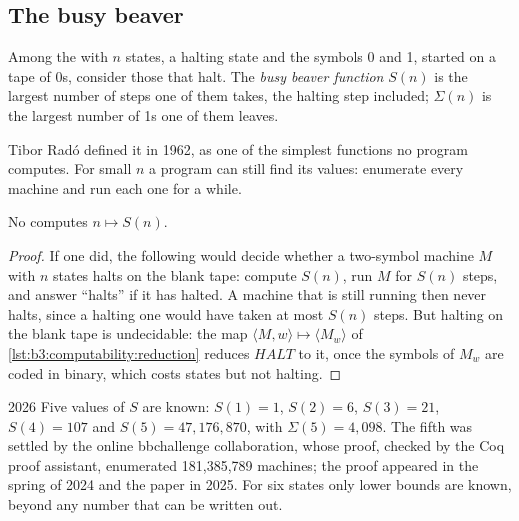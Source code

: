 \subsection{The busy beaver}

\begin{definition}\label{def:b3:computability:busy-beaver}
Among the  with $n$ states, a halting state and the symbols 0 and 1, started on a tape of 0s, consider those that halt. The \emph{busy beaver function} $S(n)$ is the largest number of steps one of them takes, the halting step included; $\Sigma(n)$ is the largest number of 1s one of them leaves.
\end{definition}

Tibor Radó defined it in 1962, as one of the simplest functions no program computes. %
For small $n$ a program can still find its values: enumerate every machine and run each one for a while.

\label{lst:b3:computability:busy}

\label{out:b3:computability:busy}

\begin{theorem}\label{thm:b3:computability:busy-beaver}
No  computes $n \mapsto S(n)$.
\end{theorem}

\begin{proof}
If one did, the following would decide whether a two-symbol machine $M$ with $n$ states halts on the blank tape: compute $S(n)$, run $M$ for $S(n)$ steps, and answer ``halts'' if it has halted. A machine that is still running then never halts, since a halting one would have taken at most $S(n)$ steps. But halting on the blank tape is undecidable: the map $\langle M, w \rangle \mapsto \langle M_w \rangle$ of \cref{lst:b3:computability:reduction} reduces $\mathit{HALT}$ to it, once the symbols of $M_w$ are coded in binary, which costs states but not halting.
\end{proof}

\begin{dated}{2026}
Five values of $S$ are known: $S(1) = 1$, $S(2) = 6$, $S(3) = 21$, $S(4) = 107$ and $S(5) = 47{,}176{,}870$, with $\Sigma(5) = 4{,}098$. The fifth was settled by the online bbchallenge collaboration, whose proof, checked by the Coq proof assistant, enumerated 181,385,789 machines; the proof appeared in the spring of 2024 and the paper in 2025. For six states only lower bounds are known, beyond any number that can be written out. %
\end{dated}

